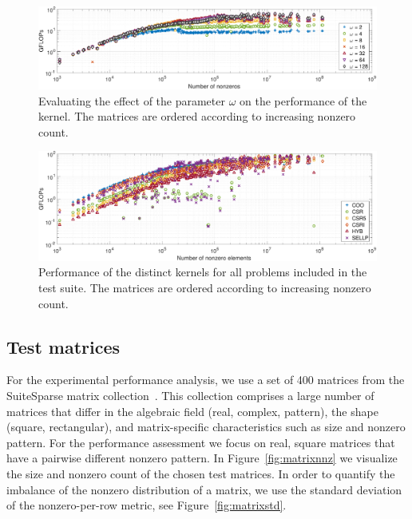 \begin{figure}
\begin{center}
\includegraphics[width=\columnwidth]{plots/COO_GFLOPS_nnz}
\end{center}
\caption{Evaluating the effect of the parameter $\omega$ on the performance of the \coo kernel. The matrices are ordered according to increasing nonzero count.}
\label{fig:COOanalysis}
\end{figure}

\begin{figure}
\begin{center}
\includegraphics[width=\columnwidth]{plots/GFLOPS_all_nnz_nnz}
\end{center}
\caption{Performance of the distinct \spmv kernels for all problems included in the test suite. The matrices are ordered according to increasing nonzero count.}
\label{fig:GFLOPsnnz}
\end{figure}


\subsection{Test matrices}
For the experimental performance analysis, we use a set of 400 matrices from the
SuiteSparse matrix collection~\cite{ufmc}. This collection 
comprises a large number of matrices that differ in the algebraic field (real, complex, pattern),
the shape (square, rectangular), and matrix-specific characteristics such as
size and nonzero pattern.
For the performance assessment we focus on real, square matrices that have a pairwise different nonzero pattern.
In Figure~\ref{fig:matrixnnz} we visualize the size and nonzero count of the chosen test matrices. 
In order to quantify the imbalance of the nonzero distribution of a matrix,
we use the standard deviation of the nonzero-per-row metric, see Figure~\ref{fig:matrixstd}.

